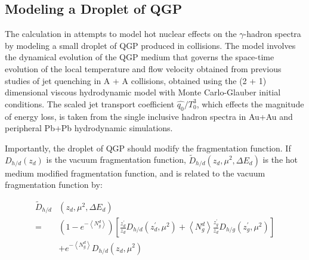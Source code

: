 


\FloatBarrier
  \subsection{Modeling a Droplet of QGP}
The calculation in \cite{Xie2021} attempts to model hot nuclear effects on the $\gamma$-hadron spectra by modeling a small droplet of QGP produced in \pPb collisions. The model involves the dynamical evolution of the QGP medium that governs the space-time evolution of the local temperature and flow velocity obtained from previous studies of jet quenching in A + A collisions, obtained using the (2 + 1) dimensional viscous hydrodynamic model with Monte Carlo-Glauber initial conditions. The scaled jet transport coefficient $\hat{q_0}/T^3_0$, which effects the magnitude of energy loss, is taken from the single inclusive hadron spectra in Au+Au and peripheral Pb+Pb hydrodynamic simulations. 

Importantly, the droplet of QGP should modify the fragmentation function. If $D_{h / d}\left(z_{d}\right)$ is the vacuum fragmentation function, $\tilde{D}_{h / d}\left(z_{d}, \mu^{2}, \Delta E_{d}\right)$ is the hot medium modified fragmentation function, and is related to the vacuum fragmentation function by:

  \begin{equation}
    \begin{aligned}
      \tilde{D}_{h / d} &\left(z_{d}, \mu^{2}, \Delta E_{d}\right) \\
      =&\left(1-e^{-\left\langle N_{g}^{d}\right\rangle}\right)\left[\frac{z_{d}^{\prime}}{z_{d}} D_{h / d}\left(z_{d}^{\prime}, \mu^{2}\right)+\left\langle N_{g}^{d}\right\rangle \frac{z_{g}^{\prime}}{z_{d}} D_{h / g}\left(z_{g}^{\prime}, \mu^{2}\right)\right] \\
       &+e^{-\left\langle N_{g}^{d}\right\rangle} D_{h / d}\left(z_{d}, \mu^{2}\right)
    \end{aligned}
  \end{equation}

